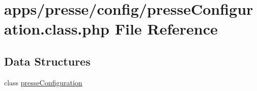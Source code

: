 \hypertarget{presse_configuration_8class_8php}{\section{apps/presse/config/presse\-Configuration.class.\-php File Reference}
\label{presse_configuration_8class_8php}
}
\subsection*{Data Structures}
\begin{DoxyCompactItemize}
\item 
class \hyperlink{classpresse_configuration}{presse\-Configuration}
\end{DoxyCompactItemize}
